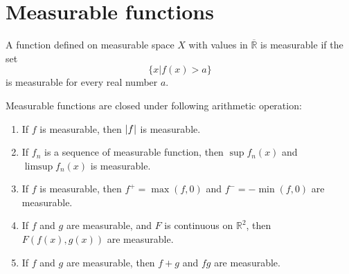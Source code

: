 \section{Measurable functions}
A function defined on measurable space $X$ with values in $\overline{\mathbb{R}}$ is measurable if the set 
\begin{equation*}
    \{x|f(x)>a\}
\end{equation*}
is measurable for every real number $a$.\par
Measurable functions are closed under following arithmetic operation:
\begin{enumerate}
    \item If $f$ is measurable, then $\left\lvert f\right\rvert$ is measurable.
    \item If $f_n$ is a sequence of measurable function, then $\sup f_n(x)$ and $\limsup f_n(x)$ is measurable.
    \item If $f$ is measurable, then $f^+=\max(f,0)$ and $f^-=-\min(f,0)$ are measurable.
    \item If $f$ and $g$ are measurable, and $F$ is continuous on $\mathbb{R}^2$, then $F(f(x),g(x))$ are measurable.
    \item If $f$ and $g$ are measurable, then $f+g$ and $fg$ are measurable.
\end{enumerate} 
